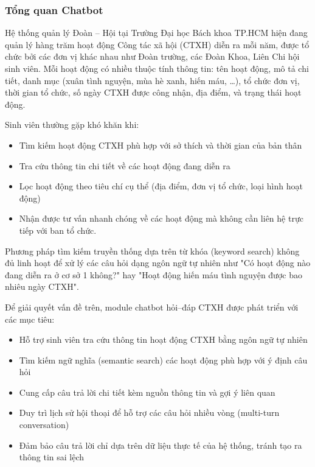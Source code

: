 \label{sec:rag-design}
\subsubsection{Tổng quan Chatbot}

Hệ thống quản lý Đoàn – Hội tại Trường Đại học Bách khoa TP.HCM hiện đang quản lý hàng trăm hoạt động Công tác xã hội (CTXH) diễn ra mỗi năm, được tổ chức bởi các đơn vị khác nhau như Đoàn trường, các Đoàn Khoa, Liên Chi hội sinh viên. Mỗi hoạt động có nhiều thuộc tính thông tin: tên hoạt động, mô tả chi tiết, danh mục (xuân tình nguyện, mùa hè xanh, hiến máu, \ldots), tổ chức đơn vị, thời gian tổ chức, số ngày CTXH được công nhận, địa điểm, và trạng thái hoạt động.

Sinh viên thường gặp khó khăn khi:
\begin{itemize}
    \item Tìm kiếm hoạt động CTXH phù hợp với sở thích và thời gian của bản thân
    \item Tra cứu thông tin chi tiết về các hoạt động đang diễn ra
    \item Lọc hoạt động theo tiêu chí cụ thể (địa điểm, đơn vị tổ chức, loại hình hoạt động)
    \item Nhận được tư vấn nhanh chóng về các hoạt động mà không cần liên hệ trực tiếp với ban tổ chức.
\end{itemize}

Phương pháp tìm kiếm truyền thống dựa trên từ khóa (keyword search) không đủ linh hoạt để xử lý các câu hỏi dạng ngôn ngữ tự nhiên như "Có hoạt động nào đang diễn ra ở cơ sở 1 không?" hay "Hoạt động hiến máu tình nguyện được bao nhiêu ngày CTXH".

Để giải quyết vấn đề trên, module chatbot hỏi–đáp CTXH được phát triển với các mục tiêu:

\begin{itemize}
    \item Hỗ trợ sinh viên tra cứu thông tin hoạt động CTXH bằng ngôn ngữ tự nhiên
    \item Tìm kiếm ngữ nghĩa (semantic search) các hoạt động phù hợp với ý định câu hỏi
    \item Cung cấp câu trả lời chi tiết kèm nguồn thông tin và gợi ý liên quan
    \item Duy trì lịch sử hội thoại để hỗ trợ các câu hỏi nhiều vòng (multi-turn conversation)
    \item Đảm bảo câu trả lời chỉ dựa trên dữ liệu thực tế của hệ thống, tránh tạo ra thông tin sai lệch
\end{itemize}

